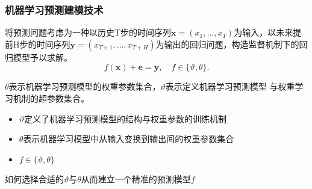 \begin{frame}
    \frametitle{机器学习预测建模技术}
    将预测问题考虑为一种以历史T步的时间序列$\bm{x} = (x_1, \ldots, x_T)$为输入，以未来提前H步的时间序列$\bm{y} = (x_{T+1},\ldots,x_{T+H})$为输出的回归问题，构造监督机制下的回归模型予以求解。
    \begin{equation*}
        f(\bm x) + \bm e = \bm y, \quad f \in \{\vartheta, \theta\}\label{eq:sec.intro.ml}.
    \end{equation*}

    \(\theta\)表示机器学习预测模型的权重参数集合，\(\vartheta\)表示定义机器学习预测模型
    与权重学习机制的超参数集合。

    \begin{itemize}
        \item \(\vartheta\)定义了机器学习预测模型的结构与权重参数的训练机制
        \item \(\theta\)表示机器学习模型中从输入变换到输出间的权重参数集合
        \item \(f \in \{\vartheta, \theta\}\)
    \end{itemize}

    \vspace{1em}
    \centering
    如何选择合适的\(\vartheta\)与\(\theta\)从而建立一个精准的预测模型\(f\)
\end{frame}

